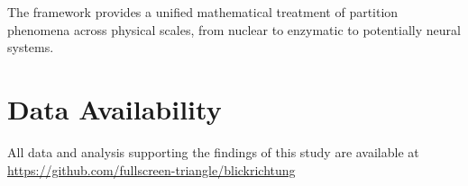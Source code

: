 \documentclass[twocolumn,amsmath,amssymb,aps,prl,superscriptaddress]{revtex4-2}
\begin{document}
The framework provides a unified mathematical treatment of partition phenomena across physical scales, from nuclear to enzymatic to potentially neural systems.

\section*{Data Availability}

All data and analysis supporting the findings of this study are available at \url{https://github.com/fullscreen-triangle/blickrichtung}


\end{document}
